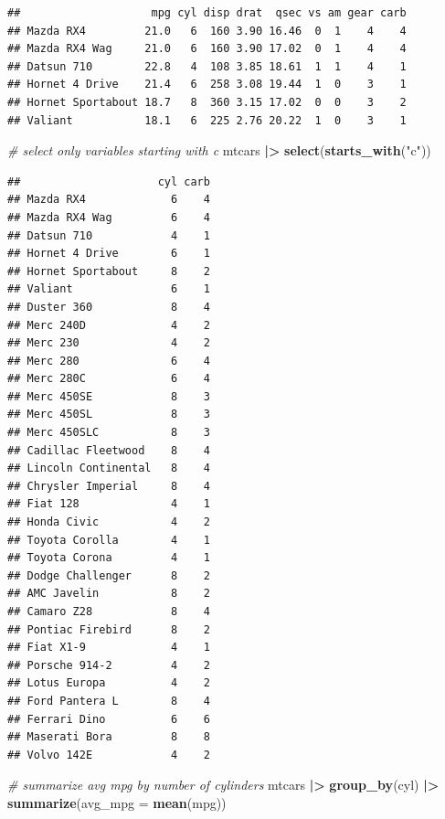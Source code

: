 \documentclass[
  12pt,
  oneside]{book}
\newenvironment{Shaded}{\begin{snugshade}}{\end{snugshade}}
\newcommand{\AttributeTok}[1]{\textcolor[rgb]{0.13,0.29,0.53}{#1}}
\newcommand{\CommentTok}[1]{\textcolor[rgb]{0.56,0.35,0.01}{\textit{#1}}}
\newcommand{\FunctionTok}[1]{\textcolor[rgb]{0.13,0.29,0.53}{\textbf{#1}}}
\newcommand{\NormalTok}[1]{#1}
\newcommand{\SpecialCharTok}[1]{\textcolor[rgb]{0.81,0.36,0.00}{\textbf{#1}}}
\newcommand{\StringTok}[1]{\textcolor[rgb]{0.31,0.60,0.02}{#1}}
\begin{document}
\begin{verbatim}
##                    mpg cyl disp drat  qsec vs am gear carb
## Mazda RX4         21.0   6  160 3.90 16.46  0  1    4    4
## Mazda RX4 Wag     21.0   6  160 3.90 17.02  0  1    4    4
## Datsun 710        22.8   4  108 3.85 18.61  1  1    4    1
## Hornet 4 Drive    21.4   6  258 3.08 19.44  1  0    3    1
## Hornet Sportabout 18.7   8  360 3.15 17.02  0  0    3    2
## Valiant           18.1   6  225 2.76 20.22  1  0    3    1
\end{verbatim}

\begin{Shaded}
\begin{Highlighting}[]
\CommentTok{\# select only variables starting with \textasciigrave{}c\textasciigrave{}}
\NormalTok{mtcars }\SpecialCharTok{|\textgreater{}} 
  \FunctionTok{select}\NormalTok{(}\FunctionTok{starts\_with}\NormalTok{(}\StringTok{"c"}\NormalTok{))}
\end{Highlighting}
\end{Shaded}

\begin{verbatim}
##                     cyl carb
## Mazda RX4             6    4
## Mazda RX4 Wag         6    4
## Datsun 710            4    1
## Hornet 4 Drive        6    1
## Hornet Sportabout     8    2
## Valiant               6    1
## Duster 360            8    4
## Merc 240D             4    2
## Merc 230              4    2
## Merc 280              6    4
## Merc 280C             6    4
## Merc 450SE            8    3
## Merc 450SL            8    3
## Merc 450SLC           8    3
## Cadillac Fleetwood    8    4
## Lincoln Continental   8    4
## Chrysler Imperial     8    4
## Fiat 128              4    1
## Honda Civic           4    2
## Toyota Corolla        4    1
## Toyota Corona         4    1
## Dodge Challenger      8    2
## AMC Javelin           8    2
## Camaro Z28            8    4
## Pontiac Firebird      8    2
## Fiat X1-9             4    1
## Porsche 914-2         4    2
## Lotus Europa          4    2
## Ford Pantera L        8    4
## Ferrari Dino          6    6
## Maserati Bora         8    8
## Volvo 142E            4    2
\end{verbatim}

\begin{Shaded}
\begin{Highlighting}[]
\CommentTok{\# summarize avg mpg by number of cylinders}
\NormalTok{mtcars }\SpecialCharTok{|\textgreater{}} 
  \FunctionTok{group\_by}\NormalTok{(cyl) }\SpecialCharTok{|\textgreater{}} 
  \FunctionTok{summarize}\NormalTok{(}\AttributeTok{avg\_mpg =} \FunctionTok{mean}\NormalTok{(mpg))}
\end{Highlighting}
\end{Shaded}
\end{document}
